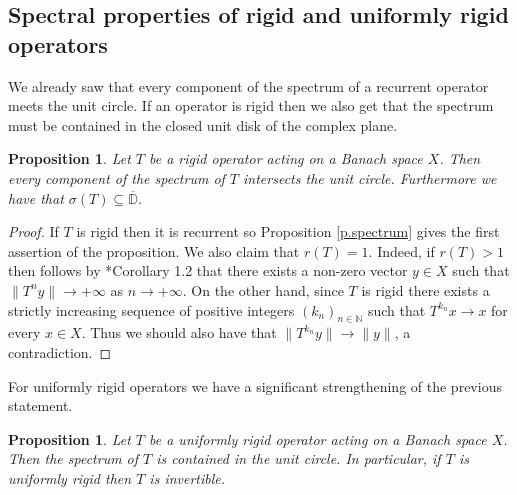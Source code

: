 \documentclass[12pt,leqno]{amsart}
\theoremstyle{plain}
\newtheorem{proposition}[equation]{Proposition}
\theoremstyle{definition}
\numberwithin{equation}{section}
\begin{document}
\subsection{Spectral properties of rigid and uniformly rigid operators} We already saw that every component of the spectrum of a recurrent operator meets the unit circle. If an operator is rigid then we also get that the spectrum must be contained in the closed unit disk of the complex plane.
\begin{proposition}\label{p.rigspec} Let $T$ be a rigid operator acting on a Banach space $X$. Then every component of the spectrum of $T$ intersects the unit circle. Furthermore we have that $\sigma(T)\subseteq \overline{\mathbb D}$.
\end{proposition}

\begin{proof} If $T$ is rigid then it is recurrent so Proposition \ref{p.spectrum} gives the first assertion of the proposition. We also claim that $r(T)=1$. Indeed, if $r(T)>1$ then follows by \cite{Muller}*{Corollary 1.2} that there exists a non-zero vector $y\in X$ such that $\|T^n y\|\to +\infty$ as $n\to +\infty$. On the other hand, since $T$ is rigid there exists a strictly increasing sequence of positive integers $(k_n)_{n\in\mathbb N}$ such that $T^{k_n}x\to x$ for every $x\in X$. Thus we  should also have that $\|T^{k_n}y\|\to \|y\|$, a contradiction.
\end{proof}

For uniformly rigid operators we have a significant strengthening of the previous statement.

\begin{proposition} Let $T$ be a uniformly rigid operator acting on a Banach space $X$. Then the spectrum of $T$ is contained in the unit circle. In particular, if $T$ is uniformly rigid then $T$ is invertible.
\end{proposition}
\end{document}
